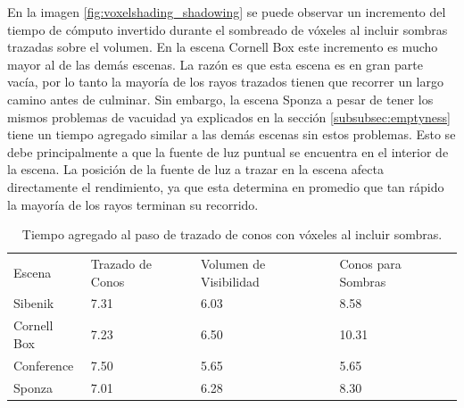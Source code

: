 En la imagen \ref{fig:voxelshading_shadowing} se puede observar un incremento del tiempo de cómputo invertido durante el sombreado de vóxeles al incluir sombras trazadas sobre el volumen. En la escena Cornell Box este incremento es mucho mayor al de las demás escenas. La razón es que esta escena es en gran parte vacía, por lo tanto la mayoría de los rayos trazados tienen que recorrer un largo camino antes de culminar. Sin embargo, la escena Sponza a pesar de tener los mismos problemas de vacuidad ya explicados en la sección \ref{subsubsec:emptyness} tiene un tiempo agregado similar a las demás escenas sin estos problemas. Esto se debe principalmente a que la fuente de luz puntual se encuentra en el interior de la escena. La posición de la fuente de luz a trazar en la escena afecta directamente el rendimiento, ya que esta determina en promedio que tan rápido la mayoría de los rayos terminan su recorrido.

\begin{table}[H]
\centering
\begin{tabular}{llll}
                                  &                                       &                                             &                                         \\ \hline
\multicolumn{1}{|l|}{Escena}      & \multicolumn{1}{l|}{Trazado de Conos} & \multicolumn{1}{l|}{Volumen de Visibilidad} & \multicolumn{1}{l|}{Conos para Sombras} \\ \hline
\multicolumn{1}{|l|}{Sibenik}     & \multicolumn{1}{l|}{7.31}             & \multicolumn{1}{l|}{6.03}                   & \multicolumn{1}{l|}{8.58}               \\
\multicolumn{1}{|l|}{Cornell Box} & \multicolumn{1}{l|}{7.23}             & \multicolumn{1}{l|}{6.50}                   & \multicolumn{1}{l|}{10.31}              \\
\multicolumn{1}{|l|}{Conference}  & \multicolumn{1}{l|}{7.50}             & \multicolumn{1}{l|}{5.65}                   & \multicolumn{1}{l|}{5.65}               \\
\multicolumn{1}{|l|}{Sponza}      & \multicolumn{1}{l|}{7.01}             & \multicolumn{1}{l|}{6.28}                   & \multicolumn{1}{l|}{8.30}               \\ \hline
\end{tabular}
\caption{Tiempo agregado al paso de trazado de conos con vóxeles al incluir sombras.}
\label{tab:shadowcone5}
\end{table}


